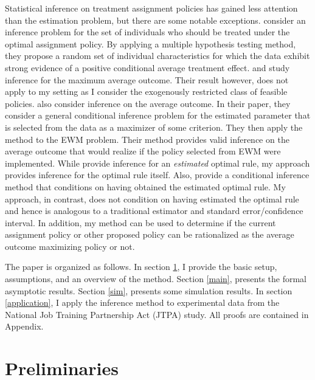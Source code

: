 \documentclass[12pt,oneside,reqno,english]{amsart}
\theoremstyle{definition}
\begin{document}
Statistical inference on treatment assignment policies has gained less attention than the estimation problem, but there are some notable exceptions.  
\cite{AS:14} consider an inference problem for the set of individuals who should be treated under the optimal assignment policy. 
By applying a multiple hypothesis testing method, they propose a random set of individual characteristics for which the data exhibit strong evidence of a positive conditional average treatment effect. 
\cite{BD:12} and \cite{LV:16} study inference for the maximum average outcome. 
Their result however, does not apply to my setting as I consider the exogenously restricted class of feasible policies. 
\cite{AKM:18} also consider inference on the average outcome. 
In their paper, they consider a general conditional inference problem for the estimated parameter that is selected from the data as a maximizer of some criterion.   
They then apply the method to the EWM problem. Their method provides valid inference on the average outcome that would realize if the policy selected from EWM were implemented. While \cite{AKM:18} provide inference for an \textit{estimated} optimal rule, my approach provides inference for the optimal rule itself. Also, \cite{AKM:18} provide a conditional inference method that conditions on having obtained the estimated optimal rule. My approach, in contrast, does not condition on having estimated the optimal rule and hence is analogous to a traditional estimator and standard error/confidence interval. 
In addition, my method can be used to determine if the current assignment policy or other proposed policy can be rationalized as the average outcome maximizing policy or not.

The paper is organized as follows. In section \ref{prelim}, I provide the basic
setup, assumptions, and an overview of the method. Section \ref{main}, presents 
the formal asymptotic results. Section \ref{sim}, presents some simulation
results. In section \ref{application}, I apply the inference method 
to experimental data from the National Job Training Partnership Act (JTPA) study.
All proofs are contained in Appendix. 
\section{Preliminaries}\label{prelim}
\end{document}
